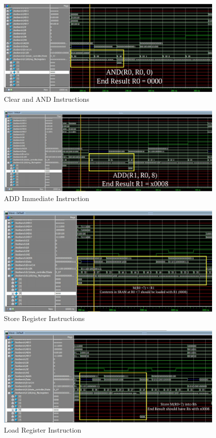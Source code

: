 \documentclass[journal, twocolumn, final,11pt,letterpaper]{IEEEtran}
\begin{document}
\begin{figure} [htbp]
	\centering
	\includegraphics[scale=0.7]{CLR_ANDi.png}
	\caption{Clear and AND Instructions\label{fig:CLR-AND}}
\end{figure}


\begin{figure} [htbp]
	\centering
	\includegraphics[scale=0.7]{ADDi.png}
	\caption{ADD Immediate Instruction\label{fig:ISDU-circuit}}
\end{figure}


\begin{figure} [htbp]
	\centering
	\includegraphics[scale=0.7]{STR.png}
	\caption{Store Register Instructions\label{fig:ISDU-circuit}}
\end{figure}


\begin{figure} [htbp]
	\centering
	\includegraphics[scale=0.7]{LDR.png}
	\caption{Load Register Instruction\label{fig:ISDU-circuit}}
\end{figure}
\end{document}
